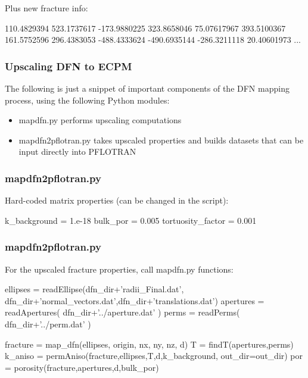 \documentclass{beamer}
\newcommand\bluecomment[1]{{{\color{blue} #1}}}
\newcommand\magentacomment[1]{{{\color{magenta} #1}}}
\begin{document}
\begin{frame} 
\begin{semiverbatim}
		
		
	\end{semiverbatim}
	\bluecomment{Plus new fracture info:}
	\begin{semiverbatim}
		110.4829394 523.1737617 -173.9880225
		323.8658046 75.07617967 393.5100367
		161.5752596 296.4383053 -488.4333624
		-490.6935144 -286.3211118 20.40601973
		...
	\end{semiverbatim}
	
\end{frame}

\begin{frame} \frametitle{Upscaling DFN to ECPM}
	The following is just a snippet of important components of the DFN mapping process, using the following Python modules:
	\begin{itemize}
		\item mapdfn.py performs upscaling computations
		\item mapdfn2pflotran.py takes upscaled properties and builds datasets that can be input directly into PFLOTRAN
	\end{itemize}
\end{frame}

\begin{frame} \frametitle{mapdfn2pflotran.py}
	Hard-coded matrix properties (can be changed in the script):
	\begin{semiverbatim}
		
		k_background = 1.e-18
		bulk_por = 0.005
		tortuosity_factor = 0.001
		
	\end{semiverbatim}
	
\end{frame}

\begin{frame} \frametitle{mapdfn2pflotran.py}
	For the upscaled fracture properties, call mapdfn.py functions:
	\begin{semiverbatim}
		
		ellipses = readEllipse(dfn_dir+'radii_Final.dat',
		  dfn_dir+'normal_vectors.dat',dfn_dir+'translations.dat')
		apertures = readApertures( dfn_dir+'../aperture.dat' )
		perms = readPerms( dfn_dir+'../perm.dat' )
		
		fracture = \magentacomment{map_dfn}(ellipses, origin, nx, ny, nz, d)
		T = \magentacomment{findT}(apertures,perms)
		k_aniso = \magentacomment{permAniso}(fracture,ellipses,T,d,k_background, 
		  out_dir=out_dir)
		por = \magentacomment{porosity}(fracture,apertures,d,bulk_por)
		
	\end{semiverbatim}
	
\end{frame}
\end{document}
